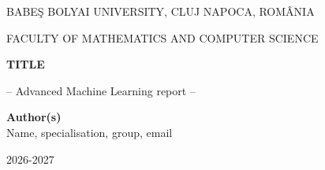 \documentclass[runningheads,a4paper,11pt]{report}
\begin{document}
\begin{titlepage}
\sloppy

\begin{center}
BABE\c S BOLYAI UNIVERSITY, CLUJ NAPOCA, ROM\^ ANIA

FACULTY OF MATHEMATICS AND COMPUTER SCIENCE

\vspace{6cm}

\Huge \textbf{TITLE}

\vspace{1cm}

\normalsize -- Advanced Machine Learning report --

\end{center}


\vspace{5cm}

\begin{flushright}
\Large{\textbf{Author(s)}}\\
Name, specialisation, group, email
\end{flushright}

\vspace{4cm}

\begin{center}
2026-2027
\end{center}

\end{titlepage}


\begin{abstract}
	Text of abstract. Short info about: 
	\begin{itemize}
		\item project relevance/importance, 
		\item inteligent methods used for solving, 
		\item data involved in the numerical experiments; 
		\item conclude by the the results obtained.
		\item Please add a graphical abstract of your work. 
	\end{itemize}

	

\noindent
\textbf{\textcolor{green}{Remind that a good report should:}}
\begin{itemize}	
	\item be fun to read with many figures and visualizations;
	\item be easy to follow even for AI/ML novice;
	\item clearly convey the potential of AI/ML to the application domain;
	\item around 10 minutes to read (although this is not a hard constraint).
\end{itemize}

\end{abstract}
\end{document}
